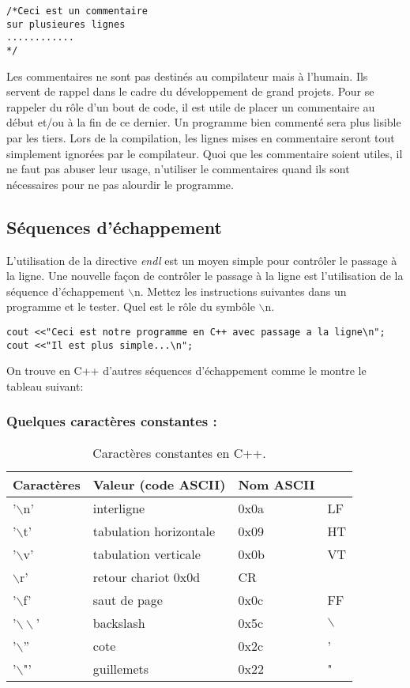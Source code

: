 \documentclass[a4paper, oneside,11pt]{book}
\begin{document}
\begin{lstlisting}
/*Ceci est un commentaire
sur plusieures lignes
............
*/
\end{lstlisting}

Les commentaires ne sont pas destin\'es au compilateur mais \`a l'humain. Ils servent de rappel dans le cadre du d\'eveloppement de grand projets. Pour se rappeler 
du r\^ole d'un bout de  code, il est utile de placer un commentaire au d\'ebut et/ou \`a la fin de ce dernier. Un programme bien comment\'e sera plus lisible par les tiers.
Lors de la compilation, les lignes mises en commentaire seront tout simplement ignor\'ees par le compilateur. Quoi que les 
commentaire soient utiles, il ne  faut pas abuser leur usage, n'utiliser le commentaires quand ils sont n\'ecessaires pour ne pas alourdir
le programme.

 
\subsection{S\'equences d'\'echappement}

L'utilisation de la directive \textit{endl} est un moyen simple pour contr\^oler le passage \`a la ligne. Une nouvelle fa\c{c}on de contr\^oler 
le passage \`a la ligne est l'utilisation de la s\'equence d'\'echappement $\backslash$n.
Mettez les instructions suivantes dans un programme et le tester. Quel est le r\^ole du symb\^ole $\backslash$n.

\begin{lstlisting}
cout <<"Ceci est notre programme en C++ avec passage a la ligne\n";
cout <<"Il est plus simple...\n";
\end{lstlisting}
On trouve en C++ d'autres  s\'equences d'\'echappement comme le montre le tableau suivant: 

\subsubsection*{Quelques caract\`eres constantes :}
\begin{table}[hhhh]
\begin{center}
 \begin{tabular}{llll}
 \hline
 \textbf{Caract\`eres} & \textbf{Valeur (code ASCII)} & \textbf{Nom ASCII}\\
  \hline
'$\backslash$n' &interligne & 0x0a & LF\\
'$\backslash$t' &tabulation horizontale& 0x09 & HT\\
'$\backslash$v' &tabulation verticale & 0x0b & VT\\
$\backslash$r' &retour chariot 0x0d& CR\\
'$\backslash$f' &saut de page &0x0c & FF\\
'$\backslash\backslash$' &backslash& 0x5c & $\backslash$ \\
'$\backslash$'' &cote& 0x2c &'\\
'$\backslash$"' &guillemets &0x22 & "\\
  \hline
 \end{tabular}
 \vspace{-0.25cm}\caption{ Caract\`eres constantes en C++.}\label{tab3}
 \end{center}
 \end{table}
\end{document}
